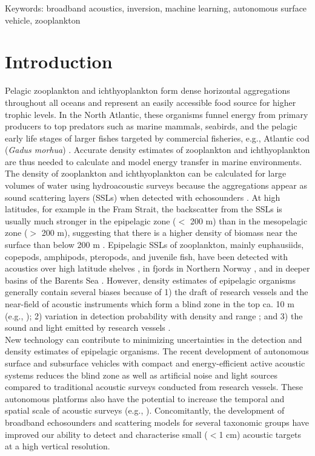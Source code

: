 Keywords: broadband acoustics, inversion, machine learning, autonomous surface vehicle, zooplankton

\section{Introduction}
Pelagic zooplankton and ichthyoplankton form dense horizontal aggregations throughout all oceans and represent an easily accessible food source for higher trophic levels. In the North Atlantic, these organisms funnel energy from primary producers to top predators such as marine mammals, seabirds, and the pelagic early life stages of larger fishes targeted by commercial fisheries, e.g., Atlantic cod (\textit{Gadus morhua}) \citep{FalkPetersen1981, Solvang2021}. Accurate density estimates of zooplankton and ichthyoplankton are thus needed to calculate and model energy transfer in marine environments. \\
The density of zooplankton and ichthyoplankton can be calculated for large volumes of water using hydroacoustic surveys because the aggregations appear as sound scattering layers (SSLs) when detected with echosounders \citep{Dietz1948, Barham1966, Proud2018}. At high latitudes, for example in the Fram Strait, the backscatter from the SSLs is usually much stronger in the epipelagic zone ($<$ 200 m) than in the mesopelagic zone ($>$ 200 m), suggesting that there is a higher density of biomass near the surface than below 200 m \citep{Knutsen2017, Gjosaeter2020}. Epipelagic SSLs of zooplankton, mainly euphausiids, copepods, amphipods, pteropods, and juvenile fish, have been detected with acoustics over high latitude shelves \citep{Knutsen2017, Bandara2022}, in fjords in Northern Norway \citep{FalkPetersen1981, FalkPetersen1985}, and in deeper basins of the Barents Sea \citep{Gjosaeter2020}. However, density estimates of epipelagic organisms generally contain several biases because of 1) the draft of research vessels and the near-field of acoustic instruments which form a blind zone in the top ca. 10 m (e.g., \citealt{Pedersen2019}); 2) variation in detection probability with density and range \citep{Appenzeller1992, Demer1995, Simmonds2008}; and 3) the sound and light emitted by research vessels \citep{Trevorrow2005, DeRobertis2012, Pena2019, Berge2020}. \\
New technology can contribute to minimizing uncertainties in the detection and density estimates of epipelagic organisms. The recent development of autonomous surface and subsurface vehicles with compact and energy-efficient active acoustic systems reduces the blind zone as well as artificial noise and light sources compared to traditional acoustic surveys conducted from research vessels. These autonomous platforms also have the potential to increase the temporal and spatial scale of acoustic surveys (e.g., \citealt{Mordy2017, DeRobertis2019, Verfuss2019}). Concomitantly, the development of broadband echosounders \citep{Andersen2021} and scattering models for several taxonomic groups \citep{Jech2015} have improved our ability to detect and characterise small ($<$1 cm) acoustic targets at a high vertical resolution. 
